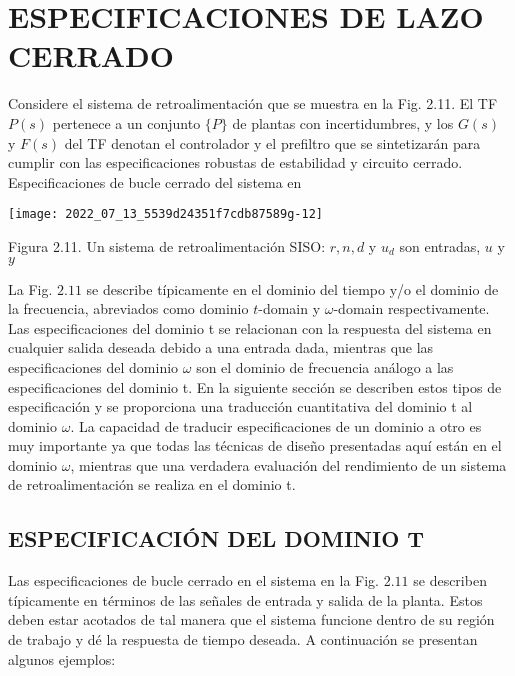 \section{ESPECIFICACIONES DE LAZO CERRADO}
Considere el sistema de retroalimentación que se muestra en la Fig. 2.11. El TF $P(s)$ pertenece a un conjunto $\{P\}$ de plantas con incertidumbres, y los $G(s)$ y $F(s)$ del TF denotan el controlador y el prefiltro que se sintetizarán para cumplir con las especificaciones robustas de estabilidad y circuito cerrado. Especificaciones de bucle cerrado del sistema en

\texttt{[image: 2022\_07\_13\_5539d24351f7cdb87589g-12]}

Figura 2.11. Un sistema de retroalimentación SISO: $r, n, d$ y $u_{d}$ son entradas, $u$ y $y$

La Fig. $2.11$ se describe típicamente en el dominio del tiempo y/o el dominio de la frecuencia, abreviados como dominio $t$-domain y $\omega$-domain respectivamente. Las especificaciones del dominio t se relacionan con la respuesta del sistema en cualquier salida deseada debido a una entrada dada, mientras que las especificaciones del dominio $\omega$ son el dominio de frecuencia análogo a las especificaciones del dominio t. En la siguiente sección se describen estos tipos de especificación y se proporciona una traducción cuantitativa del dominio t al dominio $\omega$. La capacidad de traducir especificaciones de un dominio a otro es muy importante ya que todas las técnicas de diseño presentadas aquí están en el dominio $\omega$, mientras que una verdadera evaluación del rendimiento de un sistema de retroalimentación se realiza en el dominio t.

\subsection{ESPECIFICACIÓN DEL DOMINIO T}
Las especificaciones de bucle cerrado en el sistema en la Fig. $2.11$ se describen típicamente en términos de las señales de entrada y salida de la planta. Estos deben estar acotados de tal manera que el sistema funcione dentro de su región de trabajo y dé la respuesta de tiempo deseada. A continuación se presentan algunos ejemplos:

